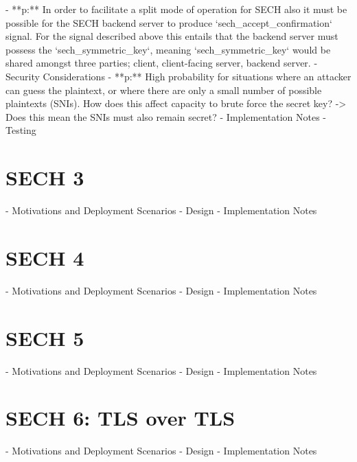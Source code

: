     - **p:** In order to facilitate a split mode of operation for SECH also it must be possible for the SECH backend server to produce `sech_accept_confirmation` signal. For the signal described above this entails that the backend server must possess the `sech_symmetric_key`, meaning `sech_symmetric_key` would be shared amongst three parties; client, client-facing server, backend server.
  - Security Considerations
    - **p:** High probability for situations where an attacker can guess the plaintext, or where there are only a small number of possible plaintexts (SNIs). How does this affect capacity to brute force the secret key? -> Does this mean the SNIs must also remain secret?
  - Implementation Notes
    - Testing
\section{SECH 3}
  - Motivations and Deployment Scenarios
  - Design
  - Implementation Notes
\section{SECH 4}
  - Motivations and Deployment Scenarios
  - Design
  - Implementation Notes
\section{SECH 5}
  - Motivations and Deployment Scenarios
  - Design
  - Implementation Notes
\section{SECH 6: TLS over TLS}
  - Motivations and Deployment Scenarios
  - Design
  - Implementation Notes






